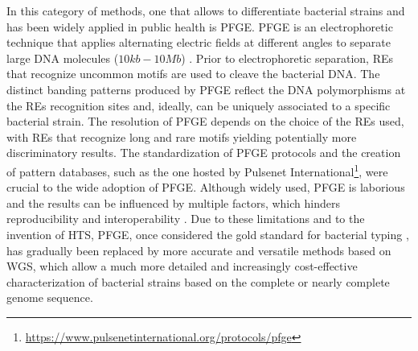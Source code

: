 In this category of methods, one that allows to differentiate bacterial strains and has been widely applied in public health is \ac{PFGE}. \ac{PFGE} is an electrophoretic technique that applies alternating electric fields at different angles to separate large \ac{DNA} molecules ($10kb-10Mb$) \cite{schwartz_separation_1984, herschleb_pulsed-field_2007, lopez-canovas_pulsed_2019}. Prior to electrophoretic separation, \ac{REs} that recognize uncommon motifs are used to cleave the bacterial \ac{DNA}. The distinct banding patterns produced by \ac{PFGE} reflect the \ac{DNA} polymorphisms at the \ac{REs} recognition sites and, ideally, can be uniquely associated to a specific bacterial strain. The resolution of \ac{PFGE} depends on the choice of the \ac{REs} used, with \ac{REs} that recognize long and rare motifs yielding potentially more discriminatory results. The standardization of \ac{PFGE} protocols and the creation of pattern databases, such as the one hosted by Pulsenet International\footnote{\url{https://www.pulsenetinternational.org/protocols/pfge}}, were crucial to the wide adoption of \ac{PFGE}. Although widely used, \ac{PFGE} is laborious and the results can be influenced by multiple factors, which hinders reproducibility and interoperability \cite{li_bacterial_2009}. Due to these limitations and to the invention of \ac{HTS}, \ac{PFGE}, once considered the gold standard for bacterial typing \cite{neoh_pulsed-field_2019}, has gradually been replaced by more accurate and versatile methods based on \ac{WGS}, which allow a much more detailed and increasingly cost-effective characterization of bacterial strains based on the complete or nearly complete genome sequence.

